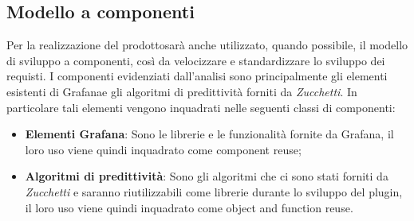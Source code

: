 

\subsection{Modello a componenti}
Per la realizzazione del prodotto\glosp sarà anche utilizzato, quando possibile, il modello di sviluppo a componenti, così da velocizzare e standardizzare lo sviluppo dei requisti.
I componenti evidenziati dall'analisi sono principalmente gli elementi esistenti di Grafana\glosp e gli algoritmi di predittività forniti da \textit{Zucchetti}.
In particolare tali elementi vengono inquadrati nelle seguenti classi di componenti:
\begin{itemize}
	\item \textbf{Elementi Grafana}\glo: Sono le librerie  e le funzionalità fornite da Grafana\glo, il loro uso viene quindi inquadrato come component reuse;
	\item \textbf{Algoritmi di predittività}: Sono gli algoritmi che ci sono stati forniti da \textit{Zucchetti} e saranno riutilizzabili come librerie durante lo sviluppo del plugin, il loro uso viene quindi inquadrato come object and function reuse.
\end{itemize}
